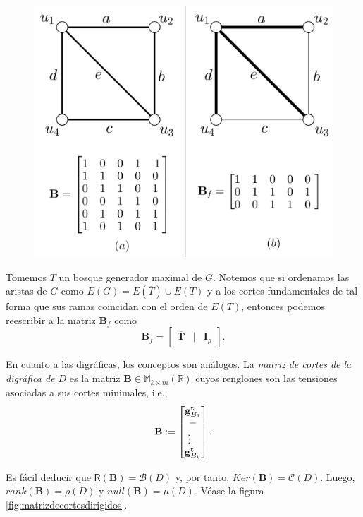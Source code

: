 \begin{figure}[h]
    \centering
    \includegraphics[scale=0.25]{img/imgchapter4/matrizdecortes.jpg}
    \caption{}
    \label{fig:matrizdecortes}
\end{figure}

Tomemos $T$ un bosque generador maximal de $G$. Notemos que si ordenamos las aristas de $G$ como $E(G) = E(\overline{T}) \cup E(T)$ y a los cortes fundamentales de tal forma que sus ramas coincidan con el orden de $E(T)$, entonces podemos reescribir a la matriz $\mathbf{B}_{f}$ como
$$
\mathbf{B}_{f} = \begin{bmatrix}
\mathbf{\overline{T}} & | & \mathbf{I}_{\rho}
\end{bmatrix}.
$$

En cuanto a las digráficas, los conceptos son análogos. La \textit{matriz de cortes de la digráfica de $D$} es la matriz $\mathbf{B} \in \mathbb{M}_{k\times m}(\mathbb{R})$ cuyos renglones son las tensiones asociadas a sus cortes minimales, i.e., $$ 
\mathbf{B}:= \begin{bmatrix} 
\mathbf{g}_{B_{1}}^{\mathbf{t}} \\
\-- \\
\vdots
\-- \\
\mathbf{g}_{B_{k}}^{\mathbf{t}}
\end{bmatrix}.
$$

Es fácil deducir que  $\mathsf{R}(\mathbf{B}) =\mathcal{B}(D)$ y, por tanto, $Ker(\mathbf{B}) = \mathcal{C}(D)$. Luego, $rank(\mathbf{B}) = \rho(D)$ y $null(\mathbf{B}) = \mu(D)$. Véase la figura \ref{fig:matrizdecortesdirigidos}.

